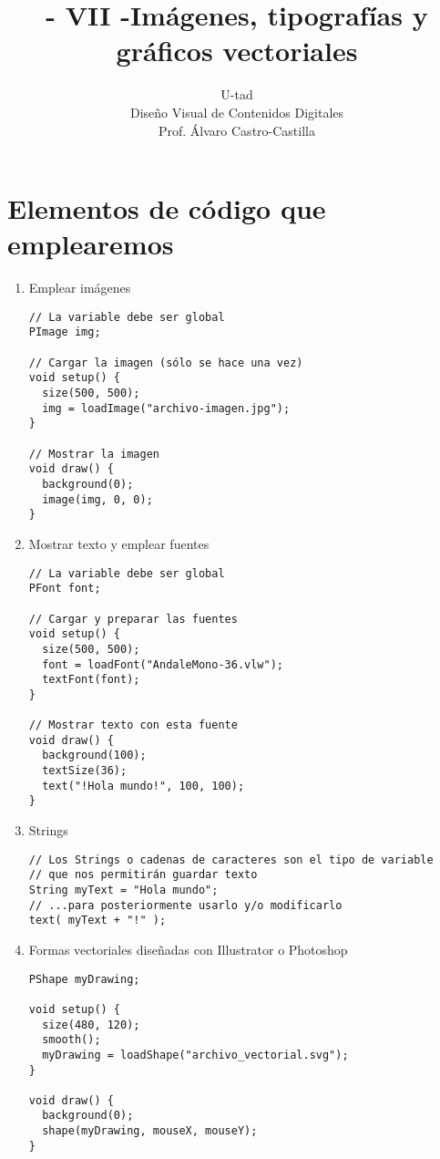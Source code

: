 \documentclass[a4paper,oneside]{article}
\title{- VII -\linebreak Imágenes, tipografías y gráficos vectoriales}
\author{U-tad\\ Diseño Visual de Contenidos Digitales\\ Prof. Álvaro Castro-Castilla}
\date{}
\begin{document}
\maketitle


\section{Elementos de código que emplearemos}
\begin{enumerate}
  \item Emplear imágenes

    \begin{verbatim}
// La variable debe ser global
PImage img;

// Cargar la imagen (sólo se hace una vez)
void setup() {
  size(500, 500);
  img = loadImage("archivo-imagen.jpg");
}

// Mostrar la imagen
void draw() {
  background(0);
  image(img, 0, 0);
}
    \end{verbatim}

  \item Mostrar texto y emplear fuentes

    \begin{verbatim}
// La variable debe ser global
PFont font;

// Cargar y preparar las fuentes
void setup() {
  size(500, 500);
  font = loadFont("AndaleMono-36.vlw");
  textFont(font);
}

// Mostrar texto con esta fuente
void draw() {
  background(100);
  textSize(36);
  text("!Hola mundo!", 100, 100);
}
    \end{verbatim}
      
  \item Strings

    \begin{verbatim}
// Los Strings o cadenas de caracteres son el tipo de variable
// que nos permitirán guardar texto
String myText = "Hola mundo";
// ...para posteriormente usarlo y/o modificarlo
text( myText + "!" );
    \end{verbatim}

  \item Formas vectoriales diseñadas con Illustrator o Photoshop

    \begin{verbatim}
PShape myDrawing;

void setup() {
  size(480, 120);
  smooth();
  myDrawing = loadShape("archivo_vectorial.svg");
}

void draw() {
  background(0);
  shape(myDrawing, mouseX, mouseY);
}
    \end{verbatim}

\end{enumerate}
\end{document}
